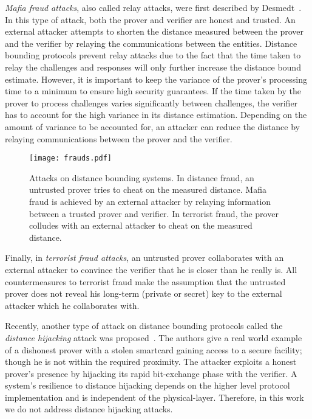 \documentclass{sig-alternate-10pt}
\begin{document}
\emph{Mafia fraud attacks}, also called relay attacks, were first described by
Desmedt~\cite{DesmedtAug87}. In this type of attack, both the prover and
verifier are honest and trusted. An external attacker attempts to shorten the
distance measured between the prover and the verifier by relaying the
communications between the entities. Distance bounding protocols prevent relay
attacks due to the fact that the time taken to relay the challenges and
responses will only further increase the distance bound estimate. However, it is
important to keep the variance of the prover's processing time to a minimum to
ensure high security guarantees. If the time taken by the prover to process
challenges varies significantly between challenges, the verifier has to account
for the high variance in its distance estimation. Depending on the amount of
variance to be accounted for, an attacker can reduce the distance by relaying
communications between the prover and the verifier.

\begin{figure}[t]
  \centering
  \texttt{[image: frauds.pdf]}
  \caption{Attacks on distance bounding systems. In distance fraud, an untrusted
    prover tries to cheat on the measured distance. Mafia fraud is achieved by
    an external attacker by relaying information between a trusted prover and
    verifier. In terrorist fraud, the prover colludes with an external attacker
    to cheat on the measured distance.}
  \label{fig:frauds}
\end{figure}


Finally, in \emph{terrorist fraud attacks}, an untrusted prover collaborates
with an external attacker to convince the verifier that he is closer than he
really is. All countermeasures to terrorist fraud make the assumption that the
untrusted prover does not reveal his long-term (private or secret) key to the
external attacker which he collaborates with.

Recently, another type of attack on distance bounding protocols called the
\emph{distance hijacking} attack was proposed~\cite{CremersMay12}. The authors
give a real world example of a dishonest prover with a stolen smartcard gaining
access to a secure facility; though he is not within the required proximity. The
attacker exploits a honest prover's presence by hijacking its rapid bit-exchange
phase with the verifier. A system's resilience to distance hijacking depends on
the higher level protocol implementation and is independent of the
physical-layer. Therefore, in this work we do not address distance hijacking
attacks.
\end{document}
